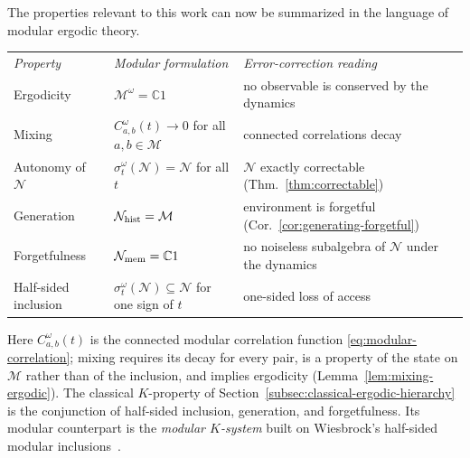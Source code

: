 \documentclass[a4paper,11pt]{article}
\theoremstyle{definition}
\begin{document}
The properties relevant to this work can now be summarized in the language of modular ergodic theory. 
\begin{center}
\begin{tabular}{lll}
 \textit{Property} & \textit{Modular formulation} & \textit{Error-correction reading}\\[4pt]
 Ergodicity & $\mathcal M^\omega=\mathbb C1$ & no observable is conserved by the dynamics\\
 Mixing & $C_{a,b}^\omega(t)\to0$ for all $a,b\in\mathcal M$ & connected correlations decay\\
 Autonomy of $\mathcal N$ & $\sigma^\omega_t(\mathcal N)=\mathcal N$ for all $t$ & $\mathcal N$ exactly correctable (Thm.~\ref{thm:correctable})\\
 Generation & $\mathcal N_{\rm hist}=\mathcal M$ & environment is forgetful (Cor.~\ref{cor:generating-forgetful})\\
 Forgetfulness & $\mathcal N_{\rm mem}=\mathbb C1$ & no noiseless subalgebra of $\mathcal N$ under the dynamics\\
 Half-sided inclusion & $\sigma^\omega_t(\mathcal N)\subseteq\mathcal N$ for one sign of $t$ & one-sided loss of access
\end{tabular}
\end{center}
Here $C^\omega_{a,b}(t)$ is the connected modular correlation function \eqref{eq:modular-correlation}; mixing requires its decay for every pair, is a property of the state on $\mathcal M$ rather than of the inclusion, and implies ergodicity (Lemma~\ref{lem:mixing-ergodic}). The classical $K$-property of Section~\ref{subsec:classical-ergodic-hierarchy} is the conjunction of half-sided inclusion, generation, and forgetfulness. Its modular counterpart is the \emph{modular $K$-system} built on Wiesbrock's half-sided modular inclusions~\cite{Wiesbrock1993}.
\end{document}
